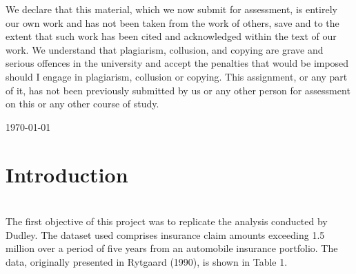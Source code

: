 \documentclass{Class/julia}
\begin{document}
\begin{titlepage}
\begin{center}
\begin{figure}[h!]
\end{figure}
\end{center}
\vfill
\begin{center}
{\small{We declare that this material, which we now submit for assessment, is entirely our own work and has not been taken from the work of others, save and to the extent that such work has been cited and acknowledged within the text of our work. We understand that plagiarism, collusion, and copying are grave and serious offences in the university and accept the penalties that would be imposed should I engage in plagiarism, collusion or copying. This assignment, or any part of it, has not been previously submitted by us or any other person for assessment on this or any other course of study.}}
\end{center}
\vfill
    {\large \today \par}
    \vfill
\end{titlepage}

\tableofcontents

\section{Introduction}

\section{}

The first objective of this project was to replicate the analysis conducted by Dudley. The dataset used comprises insurance claim amounts exceeding 1.5 million over a period of five years from an automobile insurance portfolio. The data, originally presented in Rytgaard (1990), is shown in Table 1.
\end{document}
